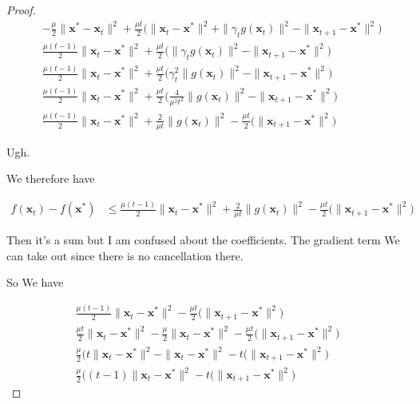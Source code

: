 \documentclass{article}
\begin{document}
\begin{proof}
			\begin{align*}
				&-\frac{\mu}{2} \|\mathbf{x}^*- \mathbf{x}_t\|^2  + \frac{\mu t}{2}\big( \| \mathbf{x}_t - \mathbf{x}^* \|^2  + \|\gamma_t g(\mathbf{x}_t) \|^2  - \|\mathbf{x}_{t+1} - \mathbf{x}^* \|^2 \big)\\
				&\frac{\mu (t-1)}{2} \| \mathbf{x}_t - \mathbf{x}^* \|^2  + \frac{\mu t}{2}\big(\|\gamma_t g(\mathbf{x}_t) \|^2  - \|\mathbf{x}_{t+1} - \mathbf{x}^* \|^2 \big)\\
				&\frac{\mu (t-1)}{2} \| \mathbf{x}_t - \mathbf{x}^* \|^2  + \frac{\mu t}{2}\big(\gamma_t^2\| g(\mathbf{x}_t) \|^2  - \|\mathbf{x}_{t+1} - \mathbf{x}^* \|^2 \big)\\
				&\frac{\mu (t-1)}{2} \| \mathbf{x}_t - \mathbf{x}^* \|^2  + \frac{\mu t}{2}\big(\frac{4}{\mu^2 t^2}\| g(\mathbf{x}_t) \|^2  - \|\mathbf{x}_{t+1} - \mathbf{x}^* \|^2 \big)\\
				&\frac{\mu (t-1)}{2} \| \mathbf{x}_t - \mathbf{x}^* \|^2  + \frac{2}{\mu t}\| g(\mathbf{x}_t) \|^2  - \frac{\mu t}{2}\big(\|\mathbf{x}_{t+1} - \mathbf{x}^* \|^2 \big)
			\end{align*}
			
			Ugh.
			
			We therefore have
			
			\begin{align*}
				f(\mathbf{x}_t) - f(\mathbf{x}^*)  &\le 
				\frac{\mu (t-1)}{2} \| \mathbf{x}_t - \mathbf{x}^* \|^2  + \frac{2}{\mu t}\| g(\mathbf{x}_t) \|^2  - \frac{\mu t}{2}\big(\|\mathbf{x}_{t+1} - \mathbf{x}^* \|^2 \big)
			\end{align*}
			
			Then it's a sum but I am confused about the coefficients.  The gradient term We can take out since there is no cancellation there. 
			
			So We have
			
			\begin{align*}
				\frac{\mu (t-1)}{2} \| \mathbf{x}_t - \mathbf{x}^* \|^2   - \frac{\mu t}{2}\big(\|\mathbf{x}_{t+1} - \mathbf{x}^* \|^2 \big)\\
				\frac{\mu t}{2} \| \mathbf{x}_t - \mathbf{x}^* \|^2 - \frac{\mu }{2} \| \mathbf{x}_t - \mathbf{x}^* \|^2  - \frac{\mu t}{2}\big(\|\mathbf{x}_{t+1} - \mathbf{x}^* \|^2 \big)\\
				\frac{\mu }{2}\bigg( t\| \mathbf{x}_t - \mathbf{x}^* \|^2 -  \| \mathbf{x}_t - \mathbf{x}^* \|^2  - t\big(\|\mathbf{x}_{t+1} - \mathbf{x}^* \|^2 \bigg)\\
				\frac{\mu }{2}\bigg( (t-1)\| \mathbf{x}_t - \mathbf{x}^* \|^2   - t\big(\|\mathbf{x}_{t+1} - \mathbf{x}^* \|^2 \bigg)
			\end{align*}
			

\end{proof}
\end{document}
